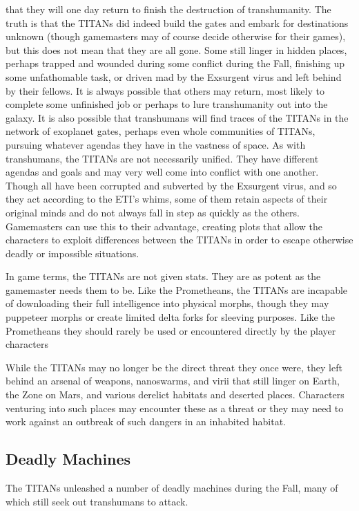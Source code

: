 that they will one day return to finish the destruction 
of transhumanity. 
The truth is that the TITANs did indeed build the 
gates and embark for destinations unknown (though 
gamemasters may of course decide otherwise for their 
games), but this does not mean that they are all gone. 
Some still linger in hidden places, perhaps trapped and 
wounded during some conflict during the Fall, finishing
up some unfathomable task, or driven mad by the
Exsurgent virus and left behind by their fellows. It is 
always possible that others may return, most likely 
to complete some unfinished job or perhaps to lure 
transhumanity out into the galaxy. It is also possible 
that transhumans will find traces of the TITANs in 
the network of exoplanet gates, perhaps even whole 
communities of TITANs, pursuing whatever agendas 
they have in the vastness of space.
As with transhumans, the TITANs are not necessarily
unified. They have different agendas and goals and
may very well come into conflict with one another. 
Though all have been corrupted and subverted by the 
Exsurgent virus, and so they act according to the ETI's 
whims, some of them retain aspects of their original 
minds and do not always fall in step as quickly as the 
others. Gamemasters can use this to their advantage, 
creating plots that allow the characters to exploit 
differences between the TITANs in order to escape 
otherwise deadly or impossible situations.

In game terms, the TITANs are not given stats. 
They are as potent as the gamemaster needs them to 
be. Like the Prometheans, the TITANs are incapable 
of downloading their full intelligence into physical 
morphs, though they may puppeteer morphs or create 
limited delta forks for sleeving purposes. Like the Prometheans
they should rarely be used or encountered
directly by the player characters

While the TITANs may no longer be the direct 
threat they once were, they left behind an arsenal of 
weapons, nanoswarms, and virii that still linger on 
Earth, the Zone on Mars, and various derelict habitats 
and deserted places. Characters venturing into such 
places may encounter these as a threat or they may 
need to work against an outbreak of such dangers in 
an inhabited habitat.

\subsection{Deadly Machines}

The TITANs unleashed a number of deadly machines 
during the Fall, many of which still seek out transhumans
to attack.

